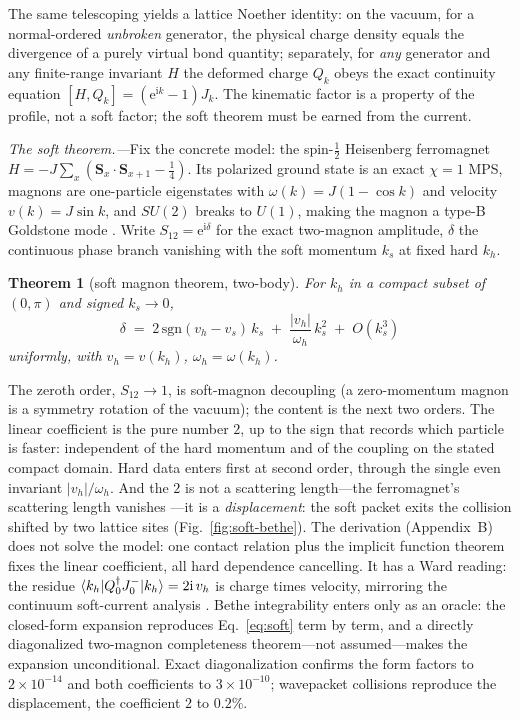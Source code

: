 \documentclass[aps,prl,twocolumn,superscriptaddress,longbibliography,floatfix]{revtex4-2}
\newtheorem{theorem}{Theorem}
\newcommand{\ic}{\ensuremath{\mathrm{i}}}
\newcommand{\ec}{\ensuremath{\mathrm{e}}}
\begin{document}
The same telescoping yields a lattice Noether identity: on the
vacuum, for a normal-ordered \emph{unbroken} generator, the physical charge
density equals the divergence of a purely virtual bond quantity;
separately, for \emph{any} generator and any finite-range invariant $H$ the
deformed charge $Q_k$ obeys the exact continuity equation
$[H,Q_k]=(\ec^{\ic k}-1)J_k$. The kinematic factor is a property of the profile, not a soft factor;
the soft theorem must be earned from the current.

\emph{The soft theorem.---}Fix the concrete model: the spin-$\frac12$
Heisenberg ferromagnet
$H=-J\sum_x(\mathbf{S}_x\!\cdot\!\mathbf{S}_{x+1}-\tfrac14)$. Its polarized
ground state is an exact $\chi=1$ MPS, magnons are one-particle eigenstates
with $\omega(k)=J(1-\cos k)$ and velocity $v(k)=J\sin k$, and $SU(2)$
breaks to $U(1)$, making the magnon a type-B Goldstone mode
\cite{WatanabeMurayama2012}. Write $S_{12}=\ec^{\ic\delta}$ for the exact
two-magnon amplitude, $\delta$ the continuous phase branch vanishing
with the soft momentum $k_s$ at fixed hard $k_h$.

\begin{theorem}[soft magnon theorem, two-body]\label{thm:soft}
For $k_h$ in a compact subset of $(0,\pi)$ and signed $k_s\to0$,
\begin{equation}
\delta \;=\; 2\,\mathrm{sgn}(v_h-v_s)\,k_s
\;+\;\frac{|v_h|}{\omega_h}\,k_s^{2}\;+\;O(k_s^{3})
\label{eq:soft}
\end{equation}
uniformly, with $v_h=v(k_h)$, $\omega_h=\omega(k_h)$.
\end{theorem}

The zeroth order, $S_{12}\to1$, is soft-magnon decoupling (a
zero-momentum magnon is a symmetry rotation of the vacuum); the content
is the next two orders. The linear coefficient is the pure number
$2$, up to the sign that records which particle is faster: independent of
the hard momentum and of the coupling on the stated compact domain. Hard data enters first
at second order, through the single even invariant $|v_h|/\omega_h$. And
the $2$ is not a scattering length---the ferromagnet's scattering length
vanishes \cite{Gongyo2016}---it is a \emph{displacement}: the soft packet
exits the collision shifted by two lattice sites
(Fig.~\ref{fig:soft-bethe}). The derivation (Appendix~B) does not solve
the model: one contact relation plus the implicit function theorem fixes
the linear coefficient, all hard dependence cancelling. It has a Ward
reading:
the residue $\braket{k_h|Q_0^{\dagger}J^-_0|k_h}=2\ic\,v_h$ is charge
times velocity, mirroring the continuum soft-current analysis
\cite{Hamada2017,Mojahed2021}. Bethe integrability enters only as an
oracle: the closed-form expansion reproduces Eq.~\eqref{eq:soft} term by
term, and a directly diagonalized two-magnon completeness theorem---not
assumed---makes the expansion unconditional.
Exact diagonalization confirms the form factors to $2\times10^{-14}$ and
both coefficients to $3\times10^{-10}$; wavepacket collisions reproduce
the displacement, the coefficient $2$ to $0.2\%$.
\end{document}
